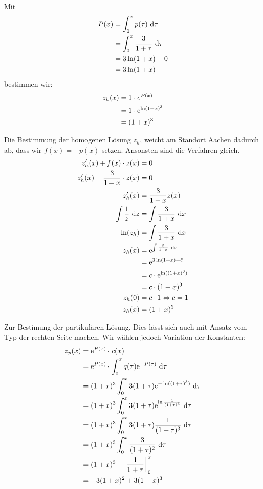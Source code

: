 \documentclass[main.tex]{subfiles}
\begin{document}
Mit
\begin{align*}
	P(x) &= \int^x_0 p(\tau) ~\mathrm{d}\tau\\
	&= \int^x_0 \frac{3}{1+\tau}~\mathrm{d}\tau\\
	&= 3\ln(1+x) - 0 \\
	&= 3\ln(1+x)
\end{align*}
bestimmen wir:
\begin{align*}
	z_h(x) &= 1\cdot e^{P(x)} \\
		   &= 1\cdot \mathrm{e}^{\ln(1+x)^3} \\
		   &= (1+x)^3
\end{align*}

Die Bestimmung der homogenen Lösung $z_h$, weicht am Standort Aachen dadurch ab, dass wir $f(x) = -p(x)$ setzen. Ansonsten sind die Verfahren gleich. 
\begin{align*}
	z_h'(x) + f(x)\cdot z(x) &= 0 \\
	z_h'(x) - \frac{3}{1+x}\cdot z(x) &= 0 \\
	z_h'(x) &= \frac{3}{1+x} z(x) \\
	\int \frac{1}{z}~\mathrm{d}z &= \int \frac{3}{1+x} ~\mathrm{d}x \\
	\ln(z_h) &= \int \frac{3}{1+x} ~\mathrm{d}x\\
	z_h(x) &= \mathrm{e}^{\int \frac{3}{1+x}~\mathrm{d}x} \\
	  &= \mathrm{e}^{3\ln(1+x)+\tilde{c}}\\
	  &= c\cdot \mathrm{e}^{\ln((1+x)^3)}\\
	  &= c\cdot (1+x)^3 \\
	z_h(0) &= c\cdot 1 \Leftrightarrow c = 1 \\
	z_h(x) &= (1+x)^3
\end{align*}

Zur Bestimung der partikulären Lösung. Dies lässt sich auch mit Ansatz vom Typ der rechten Seite machen. Wir wählen jedoch Variation der Konstanten: 
\begin{align*}
	z_p(x) &= \mathrm{e}^{P(x)} \cdot c(x)\\
		   &= \mathrm{e}^{P(x)} \cdot \int_0^x q(\tau)\mathrm{e}^{-P(\tau)} ~\mathrm{d}\tau\\
		   &= (1+x)^3 \int_0^x 3(1+\tau) \mathrm{e}^{-\ln((1+\tau)^3)} ~\mathrm{d}\tau \\
		   &= (1+x)^3 \int_0^x 3(1+\tau) \mathrm{e}^{\ln\frac{1}{(1+\tau)^3}} ~\mathrm{d}\tau \\
		   &= (1+x)^3 \int_0^x 3(1+\tau) \frac{1}{(1+\tau)^3} ~\mathrm{d}\tau \\
		   &= (1+x)^3 \int_0^x \frac{3}{(1+\tau)^2} ~\mathrm{d}\tau \\
		   &= (1+x)^3 \left[ - \frac{1}{1+\tau} \right]_0^x \\
		   &= -3(1+x)^2 + 3(1+x)^3 \\
\end{align*}
\end{document}
